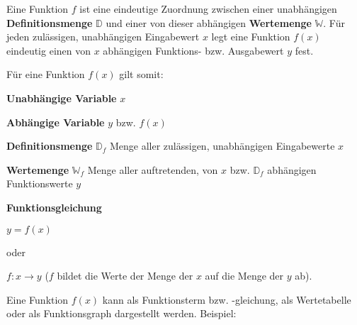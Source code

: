 



\thispagestyle{plain}



Eine Funktion $f$ ist eine eindeutige Zuordnung zwischen einer unabh\"{a}ngigen \textbf{Definitionsmenge} $\mathbb{D}$ und einer von dieser abh\"{a}ngigen \textbf{Wertemenge} $\mathbb{W}$. F\"{u}r jeden zul\"{a}ssigen, unabh\"{a}ngigen Eingabewert $x$ legt eine Funktion $f(x)$ eindeutig einen von $x$ abh\"{a}ngigen Funktions- bzw. Ausgabewert $y$ fest.

F\"{u}r eine Funktion $f(x)$ gilt somit:

\textbf{Unabh\"{a}ngige Variable}  $x$

\textbf{Abh\"{a}ngige Variable}  $y$ bzw. $f(x)$

\textbf{Definitionsmenge} $\mathbb{D}_{f}$  Menge aller zul\"{a}ssigen, unabh\"{a}ngigen Eingabewerte $x$

\textbf{Wertemenge} $\mathbb{W}_{f}$  Menge aller auftretenden, von $x$ bzw. $\mathbb{D}_{f}$ abh\"{a}ngigen Funktionswerte $y$

\textbf{Funktionsgleichung} 

$y = f(x)$

oder

$f: x \rightarrow y$ ($f$ bildet die Werte der Menge der $x$ auf die Menge der $y$ ab).


Eine Funktion $f(x)$ kann als Funktionsterm bzw. -gleichung, als Wertetabelle oder als Funktionsgraph dargestellt werden. Beispiel:

